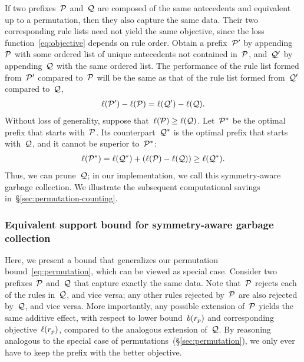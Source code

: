 If two prefixes~$\cal{P}$ and~$\cal{Q}$ are composed of the same antecedents and
equivalent up to a permutation, then they also capture the same data.
%
Their two corresponding rule lists need not yield the same objective, since the
loss function~\eqref{eq:objective} depends on rule order.
%
Obtain a prefix~$\cal{P}'$ by appending~$\cal{P}$ with some ordered list of
unique antecedents not contained in~$\cal{P}$, and~$\cal{Q}'$ by appending~$\cal{Q}$
with the same ordered list.
%
The performance of the rule list formed from~$\cal{P}'$ compared to~$\cal{P}$ will be
the same as that of the rule list formed from~$\cal{Q}'$ compared to~$\cal{Q}$, \ie
\begin{align}
\ell(\cal{P}') - \ell(\cal{P}) = \ell(\cal{Q}') - \ell(\cal{Q}).
\end{align}
Without loss of generality, suppose that~${\ell(\cal{P}) \ge \ell(\cal{Q})}$.
%
Let~$\cal{P}^*$ be the optimal prefix that starts with~$\cal{P}$.
%
Its counterpart~$\cal{Q}^*$ is the optimal prefix that starts with~$\cal{Q}$,
and it cannot be superior to~$\cal{P^*}$:
%
\begin{align}
\ell(\cal{P}^*) = \ell(\cal{Q^*}) + (\ell(\cal{P}) - \ell(\cal{Q})) \ge \ell(\cal{Q^*}).
\label{eq:permutation}
\end{align}
%
Thus, we can prune~$\cal{Q}$;
in our implementation, we call this symmetry-aware garbage collection.
%
We illustrate the subsequent computational savings in~\S\ref{sec:permutation-counting}.

\subsubsection{Equivalent support bound for symmetry-aware garbage collection}

Here, we present a bound that generalizes our permutation bound~\eqref{eq:permutation},
which can be viewed as special case.
%
Consider two prefixes~$\cal P$ and~$\cal Q$ that capture exactly the same data.
%
Note that~$\cal P$ rejects each of the rules in~$\cal Q$, and vice versa;
any other rules rejected by~$\cal P$ are also rejected by~$\cal Q$, and vice versa.
%
More importantly, any possible extension of~$\cal P$ yields the same additive effect,
with respect to lower bound~$b({r_p})$ and corresponding objective~$\ell({r_p})$,
compared to the analogous extension of~$\cal Q$.
%
By reasoning analogous to the special case of permutations~(\S\ref{sec:permutation}),
we only ever have to keep the prefix with the better objective.

